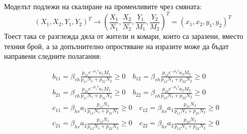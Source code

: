 Моделът подлежи на скалиране на променливите чрез смяната:
\begin{equation}
  (X_1, X_2, Y_1, Y_2)^T \rightarrow (\frac{X_1}{N_1}, \frac{X_2}{N_2}, \frac{Y_1}{M_1}, \frac{Y_2}{M_2})^T = (x_1, x_2, y_1, y_2)^T
\end{equation}
Тоест така се разглежда дяла от жители и комари, които са заразени, вместо техния брой, а за допълнително опростяване на изразите може да бъдат направени следните полагания:

\begin{equation}
  \begin{split}
    &b_{11} = \beta_{vh} \frac{p_{11} e^{-\mu_1 \tau} a_1 M_1}{p_{11} N_1 + p_{21} N_2} \geq 0 \quad
    b_{12} = \beta_{vh} \frac{p_{12} e^{-\mu_2 \tau} a_2 M_2}{p_{12} N_1 + p_{22} N_2} \geq 0 \\
    &b_{21} = \beta_{vh} \frac{p_{21} e^{-\mu_1 \tau} a_1 M_1}{p_{11} N_1 + p_{21} N_2} \geq 0 \quad
    b_{22} = \beta_{vh} \frac{p_{22} e^{-\mu_2 \tau} a_2 M_2}{p_{12} N_1 + p_{22} N_2} \geq 0 \\
    &c_{11} = \beta_{hv} a_1 \frac{p_{11} N_1}{p_{11} N_1 + p_{21} N_2} \geq 0 \quad
    c_{12} = \beta_{hv} a_1 \frac{p_{21} N_2}{p_{11} N_1 + p_{21} N_2} \geq 0 \\
    &c_{21} = \beta_{hv} a_2 \frac{p_{12} N_1}{p_{12} N_1 + p_{22} N_2} \geq 0 \quad
    c_{22} = \beta_{hv} a_2 \frac{p_{22} N_2}{p_{12} N_1 + p_{22} N_2} \geq 0 \\
  \end{split}
\end{equation}

